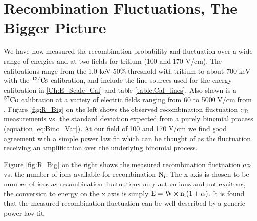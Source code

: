 \section{Recombination Fluctuations, The Bigger Picture}
We have now measured the recombination probability and fluctuation over a wide range of energies and at two fields for tritium (100 and 170 V/cm). The calibrations range from the 1.0 keV 50\% threshold with tritium to about 700 keV with the $\rm^{137}Cs$ calibration, and include the line sources used for the energy calibration in \ref{Ch:E_Scale_Cal} and table \ref{table:Cal_lines}. Also shown is a $\rm ^{57}Co$ calibration at a variety of electric fields ranging from 60 to 5000 V/cm from \cite{Dahl_Thesis}. Figure \ref{fig:R_Big} on the left shows the observed recombination fluctuation $\rm \sigma_R$ measurements vs. the standard deviation expected from a purely binomial process (equation \ref{eq:Bino_Var}). At our field of 100 and 170 V/cm we find good agreement with a simple power law fit which can be thought of as the fluctuation receiving an amplification over the underlying binomial process.

 Figure \ref{fig:R_Big} on the right shows the measured recombination fluctuation $\rm \sigma_R$ vs. the number of ions available for recombination $\rm N_i$. The x axis is chosen to be number of ions as recombination fluctuations only act on ions and not excitons, the conversion to energy on the x axis is simply $\rm E = W\times n_i (1 + \alpha ) $. It is found that the measured recombination fluctuation can be well described by a generic power law fit.

